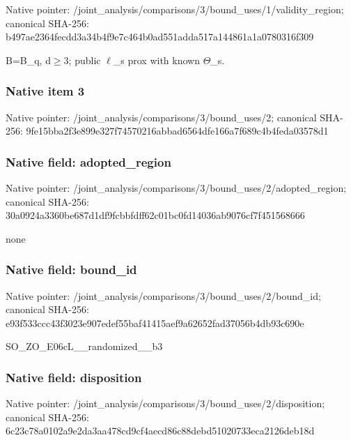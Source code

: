 \documentclass[10pt,a4paper]{article}
\begin{document}
Native pointer: /joint\_analysis/comparis\allowbreak{}ons/3/bound\_uses/1/valid\allowbreak{}ity\_region; canonical SHA-256: b497ae2364fecdd3a34b4f9e\allowbreak{}7c464b0ad551adda517a1448\allowbreak{}61a1a0780316f309


B=B\_q, d\ensuremath{\ge}3; public \ensuremath{\ell}\_s prox with known \ensuremath{\Theta}\_s.


\subsubsection{Native item 3}


Native pointer: /joint\_analysis/comparis\allowbreak{}ons/3/bound\_uses/2; canonical SHA-256: 9fe15bba2f3e899e327f7457\allowbreak{}0216abbad6564dfe166a7f68\allowbreak{}9c4b4feda03578d1



\subsubsection{Native field: adopted\_region}


Native pointer: /joint\_analysis/comparis\allowbreak{}ons/3/bound\_uses/2/adopt\allowbreak{}ed\_region; canonical SHA-256: 30a0924a3360be687d1df9fc\allowbreak{}bbfdff62c01bc0fd14036ab9\allowbreak{}076cf7f451568666


none


\subsubsection{Native field: bound\_id}


Native pointer: /joint\_analysis/comparis\allowbreak{}ons/3/bound\_uses/2/bound\allowbreak{}\_id; canonical SHA-256: e93f533ccc43f3023e907ede\allowbreak{}f55baf41415aef9a62652fad\allowbreak{}37056b4db93c690e


SO\_ZO\_E06cL\_\_randomized\_\_b3


\subsubsection{Native field: disposition}


Native pointer: /joint\_analysis/comparis\allowbreak{}ons/3/bound\_uses/2/dispo\allowbreak{}sition; canonical SHA-256: 6c23c78a0102a9e2da3aa478\allowbreak{}cd9cf4aecd86c88debd51020\allowbreak{}733eca2126deb18d
\end{document}
